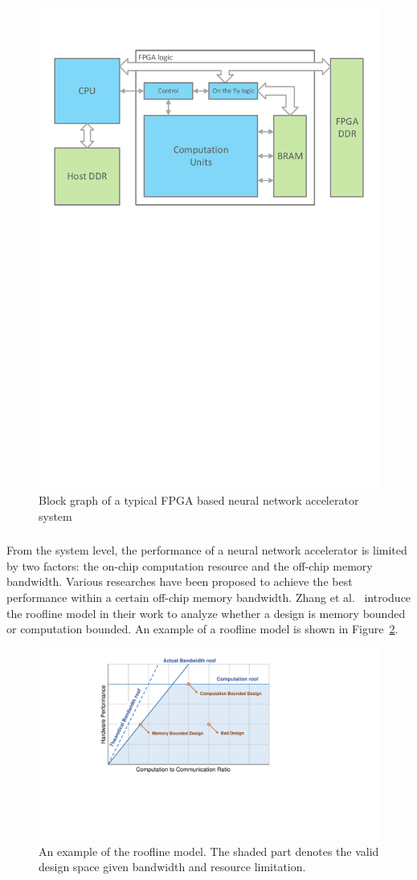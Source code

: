\begin{figure}[t]
    \centering
    \includegraphics[width=0.8\columnwidth]{fig/sys.pdf}
    \caption{Block graph of a typical FPGA based neural network accelerator system}
    \label{fig:sys}
\end{figure}

\subsubsection{} From the system level, the performance of a neural network accelerator is limited by two factors: the on-chip computation resource and the off-chip memory bandwidth. Various researches have been proposed to achieve the best performance within a certain off-chip memory bandwidth. Zhang et al.~\cite{zhang2015optimizing} introduce the roofline model in their work to analyze whether a design is memory bounded or computation bounded. An example of a roofline model is shown in Figure~\ref{fig:roofline}.

\begin{figure}[h]
    \centering
    \includegraphics[width=0.6\columnwidth]{fig/roofline.pdf}
    \caption{An example of the roofline model. The shaded part denotes the valid design space given bandwidth and resource limitation.}
    \label{fig:roofline}
\end{figure}

